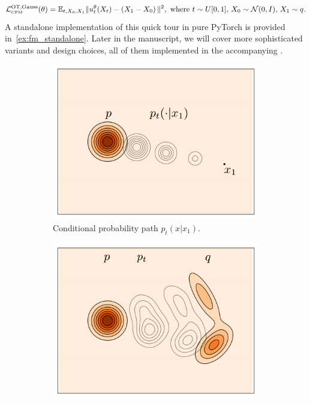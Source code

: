 \documentclass{fairmeta}
\numberwithin{equation}{section}
\begin{document}
\begin{equation}\label{eq:gauss}
    {\mathcal{L}}^{\text{{OT,Gauss}}}_{\scriptscriptstyle \text{CFM}}(\theta) = \mathbb{E}_{t, X_0, X_1} \| u^\theta_t(X_t) -\left (X_1-X_0\right ) \|^2,
    \text{ where } t \sim U[0,1],\, X_0 \sim {\mathcal{N}}(0,I),\, X_1 \sim q.     
\end{equation}
A standalone implementation of this quick tour in pure PyTorch is provided in~\cref{ex:fm_standalone}.
Later in the manuscript, we will cover more sophisticated variants and design choices, all of them implemented in the accompanying \fmlibrary.
\begin{figure}
\centering
\begin{subfigure}[b]{0.24\textwidth}
\centering
\includegraphics[width=\textwidth]{assets/p_cond.pdf}
\caption{Conditional probability path $p_t(x | x_1)$.}
\label{fig:p_t}
\end{subfigure}
\hfill
\begin{subfigure}[b]{0.24\textwidth}
\includegraphics[width=\textwidth]{assets/recepie/p_t.pdf}

\end{subfigure}
\end{figure}
\end{document}
